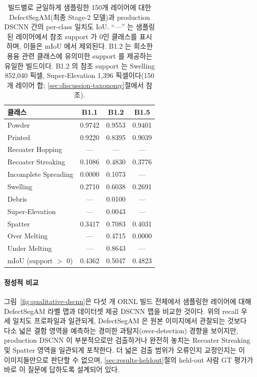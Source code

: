 \begin{table}[t]
\centering
\caption{빌드별로 균일하게 샘플링한 150개 레이어에 대한 DefectSegAM(최종
Stage-2 모델)과 production DSCNN 간의 per-class 일치도 IoU.
``---'' 는 샘플링된 레이어에서 참조 support 가 0인 클래스를 표시하며,
이들은 mIoU 에서 제외된다. B1.2 는 희소한 용융 관련 클래스에 유의미한
support 를 제공하는 유일한 빌드이다. B1.2 의 참조 support 는 Swelling
852{,}040 픽셀, Super-Elevation 1{,}396 픽셀이다(150개 레이어 합;
\ref{sec:discussion-taxonomy}절에서 참조).}
\label{tab:results-agreement-perclass}
\footnotesize
\begin{tabular}{lccc}
\toprule
클래스 & B1.1 & B1.2 & B1.5 \\
\midrule
Powder                & 0.9742 & 0.9553 & 0.9401 \\
Printed               & 0.9220 & 0.8395 & 0.9039 \\
Recoater Hopping      & ---    & ---    & ---    \\
Recoater Streaking    & 0.1086 & 0.4830 & 0.3776 \\
Incomplete Spreading  & 0.0000 & 0.1073 & ---    \\
Swelling              & 0.2710 & 0.6038 & 0.2691 \\
Debris                & ---    & 0.0100 & ---    \\
Super-Elevation       & ---    & 0.0043 & ---    \\
Spatter               & 0.3417 & 0.7083 & 0.4031 \\
Over Melting          & ---    & 0.4715 & 0.0000 \\
Under Melting         & ---    & 0.8643 & ---    \\
\midrule
mIoU (support $>$ 0)  & 0.4362 & 0.5047 & 0.4823 \\
\bottomrule
\end{tabular}
\end{table}

\paragraph{정성적 비교}
그림~\ref{fig:qualitative-dscnn}은 다섯 개 ORNL 빌드 전체에서 샘플링한
레이어에 대해 DefectSegAM 라벨 맵과 데이터셋 제공 DSCNN 맵을 비교한
것이다. 위의 recall 우세 일치도 프로파일과 일관되게, DefectSegAM 은 원본
이미지에서 관찰되는 것보다 다소 넓은 결함 영역을 예측하는 경미한
과탐지(over-detection) 경향을 보이지만, production DSCNN 이 부분적으로만
검출하거나 완전히 놓치는 Recoater Streaking 및 Spatter 영역을 일관되게
포착한다. 더 넓은 검출 범위가 오류인지 교정인지는 이 이미지들만으로 판단할
수 없으며, \ref{sec:results-heldout}절의 held-out 사람 GT 평가가 바로 이
질문에 답하도록 설계되어 있다.

